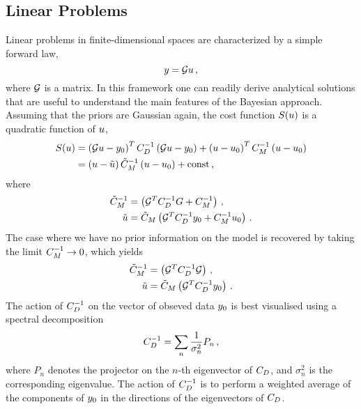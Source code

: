 \subsection{Linear Problems}
\label{sec:LinProbs}

Linear problems in finite-dimensional spaces are characterized by a simple forward law, 
\begin{equation}
  \label{eq:MatrixG}
  y = \mathcal{G} u\, ,
\end{equation}
where $\mathcal{G}$ is a matrix. In this framework one can readily  derive
analytical solutions that are useful to understand the main features of the
Bayesian approach. Assuming that the priors are Gaussian again, the cost
function $S(u)$ is a quadratic function of $u$,
\begin{align}
  \label{eq:CostLinGauss}
  S(u) &= 
  \left(\mathcal{G} u - y_0 \right)^T C_{D}^{-1} 
  \left(\mathcal{G} u - y_0 \right) + 
  \left( u - u_0 \right)^T C_M^{-1} \left(u - u_0 \right) \\
  &= 
  \left(u - \tilde{u}\right) \tilde{C}_M^{-1}
  \left(u - u_0\right) + \mathrm{const}\, ,
\end{align} 
where
\begin{align}
  \label{eq:PostParams}
  \tilde{C}_M^{-1} &= 
  \left(
    \mathcal{G}^T C_{D}^{-1} G + C_M^{-1}
  \right)\, , \\
  \tilde{u} &=
  \tilde{C}_M  \left(
    \mathcal{G}^T C_{D}^{-1} y_0 + C_M^{-1} u_0
  \right)\, .
\end{align}
The case where we have no prior information on the model is recovered by taking
the limit $C_M^{-1} \to 0$, which yields
\begin{align}
  \label{eq:NoPriorLinModel}
  \tilde{C}_M^{-1} &= 
  \left(
    \mathcal{G}^T C_{D}^{-1} \mathcal{G}
  \right)\, , \\
  \tilde{u} &=
  \tilde{C}_M  \left(
    \mathcal{G}^T C_{D}^{-1} y_0 
  \right)\, . \label{eq:NoPriorLinModelCov}
\end{align}
The action of $C_{D}^{-1}$ on the vector of obseved data $y_0$ is best visualised using a spectral decomposition
\begin{equation}
  \label{eq:CDSpecDec}
  C_{D}^{-1} = \sum_n \frac{1}{\sigma_n^2} P_n\, ,
\end{equation}
where $P_n$ denotes the projector on the $n$-th eigenvector of $C_{D}$, and
$\sigma_n^2$ is the corresponding eigenvalue. The action of $C_{D}^{-1}$ is to
perform a weighted average of the components of $y_0$ in the directions of the
eigenvectors of $C_{D}$.


